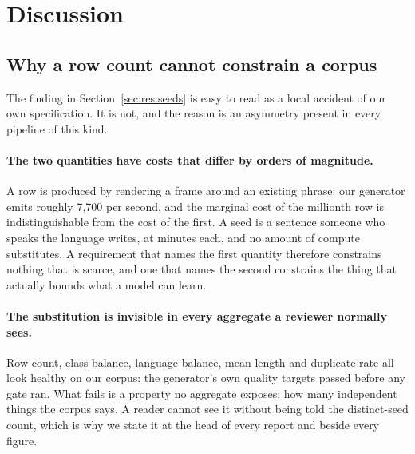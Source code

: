 %
%

\section{Discussion}
\label{sec:discussion}

\subsection{Why a row count cannot constrain a corpus}

The finding in Section~\ref{sec:res:seeds} is easy to read as a local accident of
our own specification. It is not, and the reason is an asymmetry present in every
pipeline of this kind.

\paragraph{The two quantities have costs that differ by orders of magnitude.} A
row is produced by rendering a frame around an existing phrase: our generator
emits roughly 7{,}700 per second, and the marginal cost of the millionth row is
indistinguishable from the cost of the first. A seed is a sentence someone who
speaks the language writes, at minutes each, and no amount of compute
substitutes. A requirement that names the first quantity therefore constrains
nothing that is scarce, and one that names the second constrains the thing that
actually bounds what a model can learn.

\paragraph{The substitution is invisible in every aggregate a reviewer normally
sees.} Row count, class balance, language balance, mean length and duplicate rate
all look healthy on our corpus: the generator's own quality targets passed
before any gate ran. What fails is a property no aggregate exposes: how many
independent things the corpus says. A reader cannot see it without being told the
distinct-seed count, which is why we state it at the head of every report and
beside every figure.

